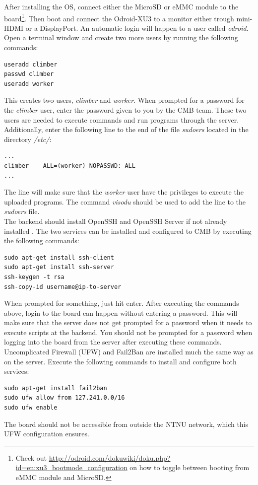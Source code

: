 \noindent
After installing the OS, connect either the MicroSD or eMMC module to the board\footnote{Check out \url{http://odroid.com/dokuwiki/doku.php?id=en:xu3_bootmode_configuration} on how to toggle between booting from eMMC module and MicroSD.}. Then boot and connect the Odroid-XU3 to a monitor either trough mini-HDMI or a DisplayPort. An automatic login will happen to a user called \textit{odroid}. Open a terminal window and create two more users by running the following commands:
\begin{lstlisting}
useradd climber
passwd climber
useradd worker
\end{lstlisting}
This creates two users, \textit{climber} and \textit{worker}. When prompted for a password for the \textit{climber} user, enter the password given to you by the CMB team. These two users are needed to execute commands and run programs through the server. Additionally, enter the following line to the end of the file \textit{sudoers} located in the directory \textit{/etc/}:
\begin{lstlisting}
...
climber    ALL=(worker) NOPASSWD: ALL
...
\end{lstlisting}
The line will make sure that the \textit{worker} user have the privileges to execute the uploaded programs. The command \textit{visodu} should be used to add the line to the \textit{sudoers} file. \\

The backend should install OpenSSH and OpenSSH Server if not already installed \cite{m:openssh}. The two services can be installed and configured to CMB by executing the following commands:
\begin{lstlisting}
sudo apt-get install ssh-client
sudo apt-get install ssh-server
ssh-keygen -t rsa
ssh-copy-id username@ip-to-server
\end{lstlisting}
When prompted for something, just hit enter. After executing the commands above, login to the board can happen without entering a password. This will make sure that the server does not get prompted for a password when it needs to execute scripts at the backend. You should not be prompted for a password when logging into the board from the server after executing these commands. \\

Uncomplicated Firewall (UFW) and Fail2Ban are installed much the same way as on the server. Execute the following commands to install and configure both services:
\begin{lstlisting}
sudo apt-get install fail2ban
sudo ufw allow from 127.241.0.0/16
sudo ufw enable
\end{lstlisting}
The board should not be accessible from outside the NTNU network, which this UFW configuration ensures.

